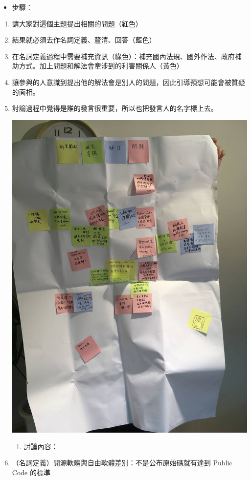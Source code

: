 \documentclass[12pt,a4paper]{article}
\begin{document}
\begin{enumerate}
\begin{enumerate}
\begin{itemize}
\item 步驟：
\end{itemize}
\begin{enumerate}
\item 請大家對這個主題提出相關的問題（紅色）
\item 結果就必須去作名詞定義、釐清、回答（藍色）
\item 在名詞定義過程中需要補充資訊（綠色）：補充國內法規、國外作法、政府補助方式。加上問題和解法會牽涉到的利害關係人（黃色）
\item 讓參與的人意識到提出他的解法會是別人的問題，因此引導預想可能會被質疑的面相。
\item 討論過程中覺得是誰的發言很重要，所以也把發言人的名字標上去。
\begin{center}
\includegraphics[width=.9\linewidth]{./images/pmpc.png}
\end{center}
\begin{enumerate}
\item 討論內容：
\end{enumerate}
\item （名詞定義）開源軟體與自由軟體差別：不是公布原始碼就有達到 Public Code 的標準

\end{enumerate}
\end{enumerate}
\end{enumerate}
\end{document}
